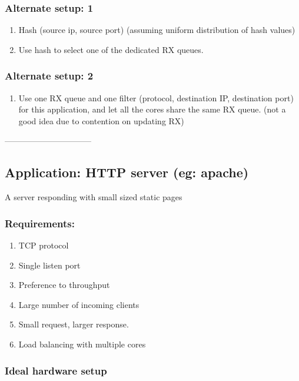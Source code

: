 \subsubsection{Alternate setup: 1}
\begin{enumerate}
       \item Hash (source ip, source port) (assuming uniform distribution of hash values)
       \item Use hash to select one of the dedicated RX queues.
\end{enumerate}

\subsubsection{Alternate setup: 2}
\begin{enumerate}
       \item Use one RX queue and one filter (protocol, destination IP,
        destination port) for this application, and let all the cores
        share the same RX queue.
        (not a good idea due to contention on updating RX)
\end{enumerate}

--------------------------------
\subsection{Application:  HTTP server (eg: apache)}
A server responding with small sized static pages
\subsubsection{Requirements:}
\begin{enumerate}
    \item TCP protocol
    \item Single listen port
    \item Preference to throughput
    \item Large number of incoming clients
    \item Small request, larger response.
    \item Load balancing with multiple cores
\end{enumerate}

\subsubsection{Ideal hardware setup}

